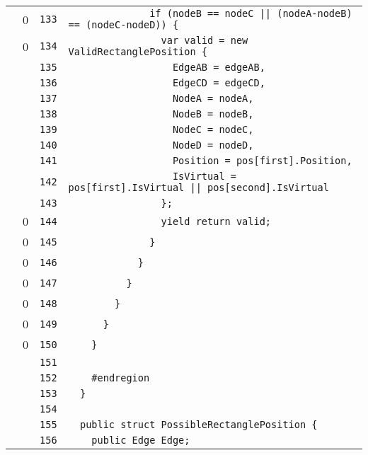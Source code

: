 \documentclass[a4paper,10pt]{article}
\begin{document}
\begin{longtable}[l]{lrrl}
\cellcolor{red} & 0 & \verb~133~ & \verb~              if (nodeB == nodeC || (nodeA-nodeB) == (nodeC-nodeD)) {~\\
\cellcolor{red} & 0 & \verb~134~ & \verb~                var valid = new ValidRectanglePosition {~\\
\cellcolor{gray} &  & \verb~135~ & \verb~                  EdgeAB = edgeAB,~\\
\cellcolor{gray} &  & \verb~136~ & \verb~                  EdgeCD = edgeCD,~\\
\cellcolor{gray} &  & \verb~137~ & \verb~                  NodeA = nodeA,~\\
\cellcolor{gray} &  & \verb~138~ & \verb~                  NodeB = nodeB,~\\
\cellcolor{gray} &  & \verb~139~ & \verb~                  NodeC = nodeC,~\\
\cellcolor{gray} &  & \verb~140~ & \verb~                  NodeD = nodeD,~\\
\cellcolor{gray} &  & \verb~141~ & \verb~                  Position = pos[first].Position,~\\
\cellcolor{gray} &  & \verb~142~ & \verb~                  IsVirtual = pos[first].IsVirtual || pos[second].IsVirtual~\\
\cellcolor{gray} &  & \verb~143~ & \verb~                };~\\
\cellcolor{red} & 0 & \verb~144~ & \verb~                yield return valid;~\\
\cellcolor{red} & 0 & \verb~145~ & \verb~              }~\\
\cellcolor{red} & 0 & \verb~146~ & \verb~            }~\\
\cellcolor{red} & 0 & \verb~147~ & \verb~          }~\\
\cellcolor{red} & 0 & \verb~148~ & \verb~        }~\\
\cellcolor{red} & 0 & \verb~149~ & \verb~      }~\\
\cellcolor{red} & 0 & \verb~150~ & \verb~    }~\\
\cellcolor{gray} &  & \verb~151~ & \verb~~\\
\cellcolor{gray} &  & \verb~152~ & \verb~    #endregion~\\
\cellcolor{gray} &  & \verb~153~ & \verb~  }~\\
\cellcolor{gray} &  & \verb~154~ & \verb~~\\
\cellcolor{gray} &  & \verb~155~ & \verb~  public struct PossibleRectanglePosition {~\\
\cellcolor{gray} &  & \verb~156~ & \verb~    public Edge Edge;~\\

\end{longtable}
\end{document}
